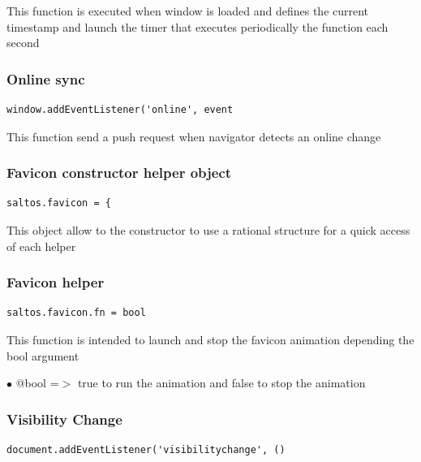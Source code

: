 \documentclass[a4paper]{article}
\begin{document}
This function is executed when window is loaded and defines the current
timestamp and launch the timer that executes periodically the function
each second

\hypertarget{toc283}{}
\subsubsection{Online sync}

\begin{lstlisting}
window.addEventListener('online', event
\end{lstlisting}

This function send a push request when navigator detects an online change

\hypertarget{toc284}{}
\subsubsection{Favicon constructor helper object}

\begin{lstlisting}
saltos.favicon = {
\end{lstlisting}

This object allow to the constructor to use a rational structure for a quick access of each
helper

\hypertarget{toc285}{}
\subsubsection{Favicon helper}

\begin{lstlisting}
saltos.favicon.fn = bool
\end{lstlisting}

This function is intended to launch and stop the favicon animation depending
the bool argument

\begin{compactitem}
\item[\color{myblue}$\bullet$] @bool =$>$ true to run the animation and false to stop the animation
\end{compactitem}

\hypertarget{toc286}{}
\subsubsection{Visibility Change}

\begin{lstlisting}
document.addEventListener('visibilitychange', ()
\end{lstlisting}
\end{document}
